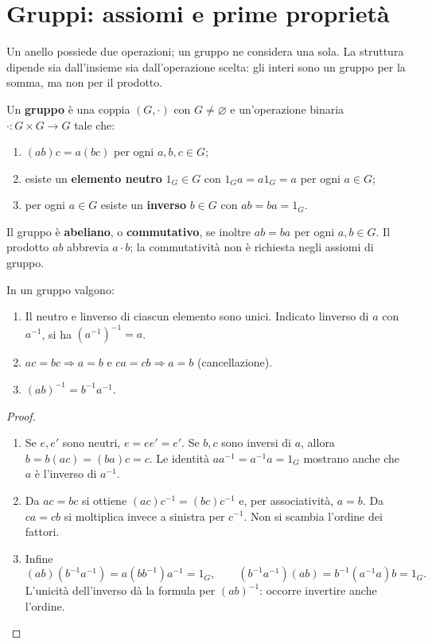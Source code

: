 \section{Gruppi: assiomi e prime proprietà}
Un anello possiede due operazioni; un gruppo ne considera una sola. La struttura dipende sia dall'insieme sia dall'operazione scelta: gli interi sono un gruppo per la somma, ma non per il prodotto.

\begin{definizione}
Un \textbf{gruppo} è una coppia $(G,\cdot)$ con $G\ne\varnothing$ e un'operazione binaria $\cdot:G\times G\to G$ tale che:
\begin{enumerate}
\item $(ab)c=a(bc)$ per ogni $a,b,c\in G$;
\item esiste un \textbf{elemento neutro} $1_G\in G$ con $1_Ga=a1_G=a$ per ogni $a\in G$;
\item per ogni $a\in G$ esiste un \textbf{inverso} $b\in G$ con $ab=ba=1_G$.
\end{enumerate}
Il gruppo è \textbf{abeliano}, o \textbf{commutativo}, se inoltre $ab=ba$ per ogni $a,b\in G$. Il prodotto $ab$ abbrevia $a\cdot b$; la commutatività non è richiesta negli assiomi di gruppo.
\end{definizione}

\begin{proposizione}\label{prop:gruppo-prime}
In un gruppo valgono:
\begin{enumerate}[label=\arabic*.]
\item Il neutro e l\textquotesingle inverso di ciascun elemento sono unici. Indicato l\textquotesingle inverso di $a$ con $a^{-1}$, si ha $(a^{-1})^{-1}=a$.
\item $ac=bc\Rightarrow a=b$ e $ca=cb\Rightarrow a=b$ (cancellazione).
\item $(ab)^{-1}=b^{-1}a^{-1}$.
\end{enumerate}
\end{proposizione}
\begin{proof}
\begin{enumerate}[label=\arabic*.]
\item Se $e,e'$ sono neutri, $e=ee'=e'$. Se $b,c$ sono inversi di $a$, allora $b=b(ac)=(ba)c=c$. Le identità $aa^{-1}=a^{-1}a=1_G$ mostrano anche che $a$ è l'inverso di $a^{-1}$.
\item Da $ac=bc$ si ottiene $(ac)c^{-1}=(bc)c^{-1}$ e, per associatività, $a=b$. Da $ca=cb$ si moltiplica invece a sinistra per $c^{-1}$. Non si scambia l'ordine dei fattori.
\item Infine
\[
(ab)(b^{-1}a^{-1})=a(bb^{-1})a^{-1}=1_G,
\qquad (b^{-1}a^{-1})(ab)=b^{-1}(a^{-1}a)b=1_G.
\]
L'unicità dell'inverso dà la formula per $(ab)^{-1}$: occorre invertire anche l'ordine.
\end{enumerate}
\end{proof}

